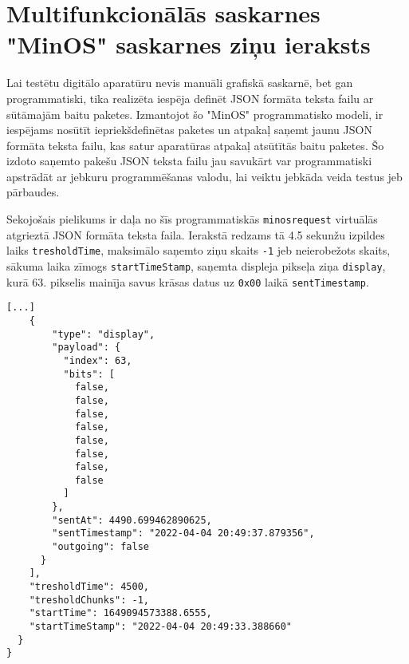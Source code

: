 \section{Multifunkcionālās saskarnes "MinOS" saskarnes ziņu ieraksts}
\label{att:minosrequest}

Lai testētu digitālo aparatūru nevis manuāli grafiskā saskarnē, bet gan
programmatiski, tika realizēta iespēja definēt JSON formāta teksta failu ar
 sūtāmajām baitu paketes. Izmantojot šo "MinOS"
programmatisko modeli, ir iespējams nosūtīt iepriekšdefinētas
 paketes un atpakaļ saņemt jaunu JSON formāta
teksta failu, kas satur aparatūras atpakaļ atsūtītās baitu paketes. Šo
 izdoto saņemto pakešu JSON teksta failu jau
savukārt var programmatiski apstrādāt ar jebkuru programmēšanas valodu, lai
veiktu jebkāda veida testus jeb pārbaudes.

Sekojošais pielikums ir daļa no šīs programmatiskās \lstinline!minosrequest!
virtuālās  atgrieztā JSON formāta teksta faila.
Ierakstā redzams tā 4.5 sekunžu izpildes laiks \lstinline!tresholdTime!,
maksimālo saņemto ziņu skaits \lstinline!-1! jeb neierobežots skaits, sākuma
laika zīmogs \lstinline!startTimeStamp!, saņemta displeja pikseļa ziņa
\lstinline!display!, kurā 63. pikselis mainīja savus krāsas datus uz
\lstinline!0x00! laikā \lstinline!sentTimestamp!.

\begin{lstlisting}[caption={\lstinline!minosrequest! \glslink{firmware}{programmaparatūras} ziņu ieraksts JSON formātā},label={lst:buttonleds},captionpos=b]
    [...]
    {
        "type": "display",
        "payload": {
          "index": 63,
          "bits": [
            false,
            false,
            false,
            false,
            false,
            false,
            false,
            false
          ]
        },
        "sentAt": 4490.699462890625,
        "sentTimestamp": "2022-04-04 20:49:37.879356",
        "outgoing": false
      }
    ],
    "tresholdTime": 4500,
    "tresholdChunks": -1,
    "startTime": 1649094573388.6555,
    "startTimeStamp": "2022-04-04 20:49:33.388660"
  }
}
\end{lstlisting}
